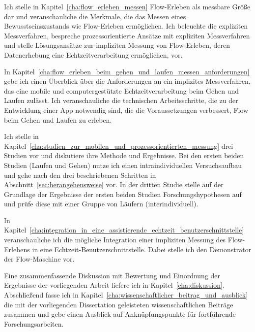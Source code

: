 Ich stelle in Kapitel~\ref{cha:flow_erleben_messen} Flow-Erleben als messbare Größe dar und veranschauliche die Merkmale, die das Messen eines Bewusstseinszustands wie Flow-Erleben ermöglichen. Ich beleuchte die expliziten Messverfahren, bespreche prozessorientierte Ansätze mit expliziten Messverfahren und stelle Lösungsansätze zur impliziten Messung von Flow-Erleben, deren Datenerhebung eine Echtzeitverarbeitung ermöglichen, vor.

In Kapitel~\ref{cha:flow_erleben_beim_gehen_und_laufen_messen_anforderungen} gebe ich einen Überblick über die Anforderungen an ein implizites Messverfahren, das eine mobile und computergestützte Echtzeitverarbeitung beim Gehen und Laufen zulässt. Ich veranschauliche die technischen Arbeitsschritte, die zu der Entwicklung einer App notwendig sind, die die Voraussetzungen verbessert, Flow beim Gehen und Laufen zu erleben.

Ich stelle in Kapitel~\ref{cha:studien_zur_mobilen_und_prozessorientierten_messung} drei Studien vor und diskutiere ihre Methode und Ergebnisse. Bei den ersten beiden Studien (Laufen und Gehen) nutze ich einen intraindividuellen Versuchsaufbau und gehe nach den drei beschriebenen Schritten in Abschnitt~\ref{sec:herangehensweise} vor. In der dritten Studie stelle auf der Grundlage der Ergebnisse der ersten beiden Studien Forschungshypothesen auf und prüfe diese mit einer Gruppe von Läufern (interindividuell).

In Kapitel~\ref{cha:integration_in_eine_assistierende_echtzeit_benutzerschnittstelle} veranschauliche ich die mögliche Integration einer impliziten Messung des Flow-Erlebens in eine Echtzeit-Benutzerschnittstelle. Dabei stelle ich den Demonstrator der Flow-Maschine vor.

Eine zusammenfassende Diskussion mit Bewertung und Einordnung der Ergebnisse der vorliegenden Arbeit liefere ich in Kapitel~\ref{cha:diskussion}. Abschließend fasse ich in Kapitel~\ref{cha:wissenschaftlicher_beitrag_und_ausblick} die mit der vorliegenden Dissertation geleisteten wissenschaftlichen Beiträge zusammen und gebe einen Ausblick auf Anknüpfungspunkte für fortführende Forschungsarbeiten.

